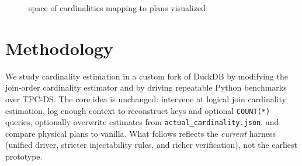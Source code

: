 \documentclass[sigconf,nonacm]{acmart}
\begin{document}
\begin{figure}[H]
    \centering
    \caption{space of cardinalities mapping to plans visualized}
    \label{fig:subspaces}
\end{figure}

\section{Methodology}
\label{sec:methodology}

We study cardinality estimation in a custom fork of DuckDB by modifying the join-order cardinality estimator and by driving repeatable Python benchmarks over TPC-DS. The core idea is unchanged: intervene at logical join cardinality estimation, log enough context to reconstruct keys and optional \texttt{COUNT(*)} queries, optionally overwrite estimates from \texttt{actual\_cardinality.json}, and compare physical plans to vanilla. What follows reflects the \emph{current} harness (unified driver, stricter injectability rules, and richer verification), not the earliest prototype.
\end{document}
